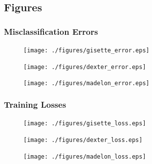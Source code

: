 \documentclass[UTF8]{article}
\begin{document}
\subsection{Figures}
\subsubsection{Misclassification Errors}
\begin{figure}[H]
    \centering
    \texttt{[image: ./figures/gisette\_error.eps]}
\end{figure}
\begin{figure}[H]
    \centering
    \texttt{[image: ./figures/dexter\_error.eps]}
\end{figure}
\begin{figure}[H]
    \centering
    \texttt{[image: ./figures/madelon\_error.eps]}
\end{figure}

\subsubsection{Training Losses}
\begin{figure}[H]
    \centering
    \texttt{[image: ./figures/gisette\_loss.eps]}
\end{figure}
\begin{figure}[H]
    \centering
    \texttt{[image: ./figures/dexter\_loss.eps]}
\end{figure}
\begin{figure}[H]
    \centering
    \texttt{[image: ./figures/madelon\_loss.eps]}
\end{figure}

\newpage
\end{document}
